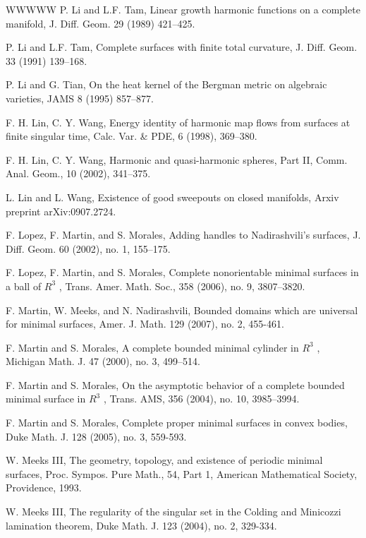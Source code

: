 \begin{thebibliography}{WWWWW}
 P. Li and L.F. Tam, Linear growth harmonic functions on a complete manifold, J. Diff. Geom. 29 (1989) 421–425.

 P. Li and L.F. Tam, Complete surfaces with finite total curvature, J. Diff. Geom. 33 (1991) 139–168.

 P. Li and G. Tian, On the heat kernel of the Bergman metric on algebraic varieties, JAMS 8 (1995) 857–877.

 F. H. Lin, C. Y. Wang, Energy identity of harmonic map flows from surfaces at finite singular time, Calc. Var. \& PDE, 6 (1998), 369–380.

 F. H. Lin, C. Y. Wang, Harmonic and quasi-harmonic spheres, Part II, Comm. Anal. Geom., 10 (2002), 341–375.

 L. Lin and L. Wang, Existence of good sweepouts on closed manifolds, Arxiv preprint arXiv:0907.2724.

 F. Lopez, F. Martin, and S. Morales, Adding handles to Nadirashvili's surfaces, J. Diff. Geom. 60 (2002), no. 1, 155–175.

 F. Lopez, F. Martin, and S. Morales, Complete nonorientable minimal surfaces in a ball of $R^{3}$ , Trans. Amer. Math. Soc., 358 (2006), no. 9, 3807–3820.

 F. Martin, W. Meeks, and N. Nadirashvili, Bounded domains which are universal for minimal surfaces, Amer. J. Math. 129 (2007), no. 2, 455-461.

 F. Martin and S. Morales, A complete bounded minimal cylinder in $R^{3}$ , Michigan Math. J. 47 (2000), no. 3, 499–514.

 F. Martin and S. Morales, On the asymptotic behavior of a complete bounded minimal surface in $R^{3}$ , Trans. AMS, 356 (2004), no. 10, 3985–3994.

 F. Martin and S. Morales, Complete proper minimal surfaces in convex bodies, Duke Math. J. 128 (2005), no. 3, 559-593.

 W. Meeks III, The geometry, topology, and existence of periodic minimal surfaces, Proc. Sympos. Pure Math., 54, Part 1, American Mathematical Society, Providence, 1993.

 W. Meeks III, The regularity of the singular set in the Colding and Minicozzi lamination theorem, Duke Math. J. 123 (2004), no. 2, 329-334.


\end{thebibliography}
